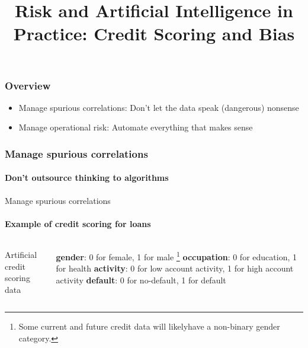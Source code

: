 

\title{Risk and Artificial Intelligence in Practice: Credit Scoring and Bias}

\maketitle

\begin{frame}
    \frametitle{Overview}
    \begin{itemize}
        \item Manage spurious correlations: Don't let the data speak (dangerous) nonsense
        \item Manage operational risk: Automate everything that makes sense
    \end{itemize}
\end{frame}

\begin{frame}
\frametitle{Manage spurious correlations}
\framesubtitle{Don't outsource thinking to algorithms}
    \begin{center}
    \end{center}
\end{frame}

\begin{frame}{Manage spurious correlations}
    \framesubtitle{Example of credit scoring for loans}
    \begin{columns}[T] %
        \begin{column}{.6\textwidth}
            Artificial credit scoring data
            \newline\newline
            \newline
        \end{column}%
        \begin{column}{.4\textwidth}
            \textbf{gender}: 0 for female, 1 for male \footnote{
                Some current and future credit data will likely\newline have a non-binary gender category.
            } \newline
            \textbf{occupation}: 0 for education, 1 for health \newline
            \textbf{activity}: 0 for low account activity, 1 for high account activity \newline
            \textbf{default}: 0 for no-default, 1 for default \newline
        \end{column}%
        \end{columns}

\end{frame}


